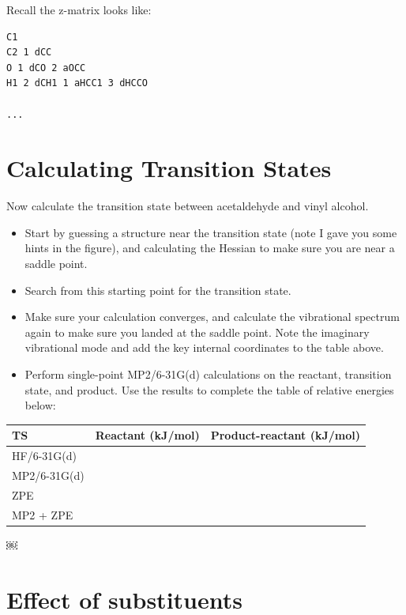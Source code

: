 \documentclass[11pt]{article}
\begin{document}
Recall the z-matrix looks like:

\begin{verbatim}
C1
C2 1 dCC
O 1 dCO 2 aOCC
H1 2 dCH1 1 aHCC1 3 dHCCO 

...
\end{verbatim}


\section{Calculating Transition States}
\label{sec-2}

Now calculate the transition state between acetaldehyde and vinyl alcohol.


\begin{itemize}
\item Start by guessing a structure near the transition state (note I gave you some hints in the figure), and calculating the Hessian to make sure you are near a saddle point.

\item Search from this starting point for the transition state.

\item Make sure your calculation converges, and calculate the vibrational spectrum again to make sure you landed at the saddle point. Note the imaginary vibrational mode and add the key internal coordinates to the table above.

\item Perform single-point MP2/6-31G(d) calculations on the reactant, transition state, and product. Use the results to complete the table of relative energies below:
\end{itemize}

\begin{center}
\begin{tabular}{lll}
TS & Reactant  (kJ/mol) & Product-reactant  (kJ/mol)\\
\hline
HF/6-31G(d) &  & \\
MP2/6-31G(d) &  & \\
ZPE &  & \\
MP2 + ZPE &  & \\
\end{tabular}
\end{center}
￼

\section{Effect of substituents}
\label{sec-3}
\end{document}
